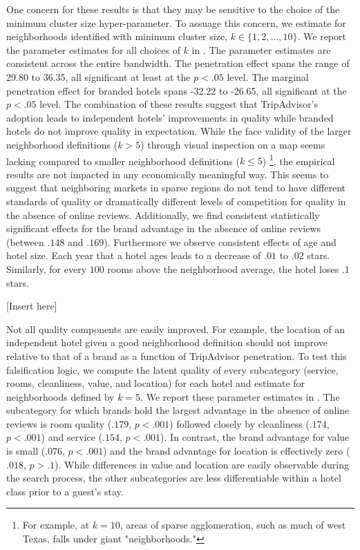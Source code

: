 \documentclass[mksc,blindrev]{informs3} %
\begin{document}
One concern for these results is that they may be sensitive to the choice of the minimum cluster size hyper-parameter. To assuage this concern, we estimate  for neighborhoods identified with minimum cluster size, $k\in\{1,2,...,10\}$. We report the parameter estimates for all choices of $k$ in . The parameter estimates are consistent across the entire bandwidth. The penetration effect spans the range of 29.80 to 36.35, all significant at least at the $p<.05$ level. The marginal penetration effect for branded hotels spans -32.22 to -26.65, all significant at the $p<.05$ level. The combination of these results suggest that TripAdvisor's adoption leads to independent hotels' improvements in quality while branded hotels do not improve quality in expectation. While the face validity of the larger neighborhood definitions ($k>5$) through visual inspection on a map seems lacking compared to smaller neighborhood definitions ($k\le 5$) \footnote{For example, at $k=10$, areas of sparse agglomeration, such as much of west Texas, falls under giant "neighborhoods."}, the empirical results are not impacted in any economically meaningful way. This seems to suggest that neighboring markets in sparse regions do not tend to have different standards of quality or dramatically different levels of competition for quality in the absence of online reviews. Additionally, we find consistent statistically significant effects for the brand advantage in the absence of online reviews (between $.148$ and $.169$). Furthermore we observe consistent effects of age and hotel size. Each year that a hotel ages leads to a decrease of $.01$ to $.02$ stars. Similarly, for every $100$ rooms above the neighborhood average, the hotel loses $.1$ stars.

[Insert  here]

Not all quality components are easily improved. For example, the location of an independent hotel given a good neighborhood definition should not improve relative to that of a brand as a function of TripAdvisor penetration. To test this falsification logic, we compute the latent quality of every subcategory (service, rooms, cleanliness, value, and location) for each hotel and estimate  for neighborhoods defined by $k=5$. We report these parameter estimates in . The subcategory for which brands hold the largest advantage in the absence of online reviews is room quality ($.179$, $p<.001$) followed closely by cleanliness ($.174$, $p<.001$) and service ($.154$, $p<.001$). In contrast, the brand advantage for value is small ($.076$, $p<.001$) and the brand advantage for location is effectively zero ($.018$, $p>.1$). While differences in value and location are easily observable during the search process, the other subcategories are less differentiable within a hotel class prior to a guest's stay. 
\end{document}
